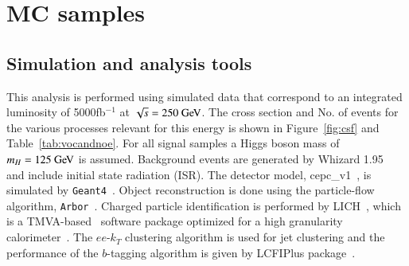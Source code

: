 \documentclass[11pt,a4paper]{cepcnote}
\begin{document}
\section{MC samples}
\subsection{Simulation and analysis tools}
This analysis is performed using simulated data that correspond to an integrated luminosity of 5000fb$^{-1}$ at $\sqrt s =250\gev$.
The cross section and No. of events for the various processes relevant for this energy is shown in Figure~\ref{fig:csf} and Table~\ref{tab:vocandnoe}. 
For all signal samples a Higgs boson mass of $m_H = 125\gev$ is assumed. 
Background events are generated by Whizard 1.95~\cite{Kilian:2007gr} and include initial state radiation (ISR). 
The detector model, cepc\_v1~\cite{CEPC-SPPCStudyGroup:2015csa}, is simulated by {\tt Geant4}~\cite{Agostinelli:2002hh}. 
Object reconstruction is done using the particle-flow algorithm, {\tt Arbor}~\cite{Ruan:2014paa}.
Charged particle identification is performed by LICH~\cite{Yu:2017mpx}, 
which is a TMVA-based~\cite{Therhaag:2009dp} software package optimized for a high granularity calorimeter~\cite{Brient:2002gh}. 
The $ee$-$k_T$ clustering algorithm is used for jet clustering and the performance of the $b$-tagging algorithm is given by 
LCFIPlus package~\cite{Suehara:2015ura}.
\end{document}
